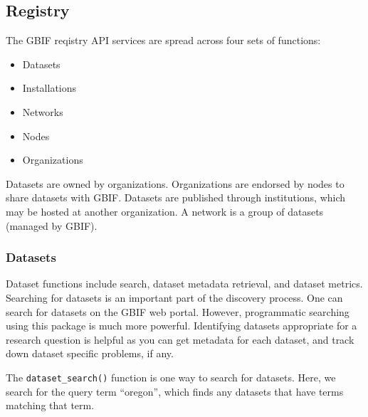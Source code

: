 \documentclass[author-year, review, 11pt]{components/elsarticle} %
\begin{document}
\subsection{Registry}\label{registry}

The GBIF reqistry API services are spread across four sets of functions:

\begin{itemize}
\itemsep1pt\parskip0pt
\item
  Datasets
\item
  Installations
\item
  Networks
\item
  Nodes
\item
  Organizations
\end{itemize}

Datasets are owned by organizations. Organizations are endorsed by nodes
to share datasets with GBIF. Datasets are published through
institutions, which may be hosted at another organization. A network is
a group of datasets (managed by GBIF).

\subsubsection{Datasets}\label{datasets}

Dataset functions include search, dataset metadata retrieval, and
dataset metrics. Searching for datasets is an important part of the
discovery process. One can search for datasets on the GBIF web portal.
However, programmatic searching using this package is much more
powerful. Identifying datasets appropriate for a research question is
helpful as you can get metadata for each dataset, and track down dataset
specific problems, if any.

The \texttt{dataset\_search()} function is one way to search for
datasets. Here, we search for the query term ``oregon'', which finds any
datasets that have terms matching that term.
\end{document}
